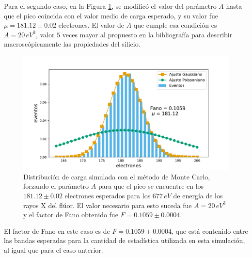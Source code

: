 \noindent Para el segundo caso, en la Figura \ref{fig:F_fano_A20}, se modificó el valor del parámetro $A$ hasta que el pico coincida con el valor medio de carga esperado, y su valor fue $\mu = 181.12 \pm 0.02$ electrones. El valor de $A$ que cumple esa condición es $A = 20\,\si{eV}^{3}$, valor $5$ veces mayor al propuesto en la bibliografía para describir macroscópicamente las propiedades del silicio.
\begin{figure}[h]
    \centering
    \includegraphics[scale=0.5]{Figs/F_Fano_E677_A20_Eloss0_100ktrials.pdf}
    \caption{Distribución de carga simulada con el método de Monte Carlo, forzando el parámetro $A$ para que el pico se encuentre en los $181.12 \pm 0.02$ electrones esperados para los $677\,\si{eV}$ de energía de los rayos X del flúor. El valor necesario para esto suceda fue $A=20\,\si{eV}^{3}$ y el factor de Fano obtenido fue $F = 0.1059 \pm 0.0004$.}
    \label{fig:F_fano_A20}
\end{figure}
El factor de Fano en este caso es de $F = 0.1059 \pm 0.0004$, que está contenido entre las bandas esperadas para la cantidad de estadística utilizada en esta simulación, al igual que para el caso anterior.

